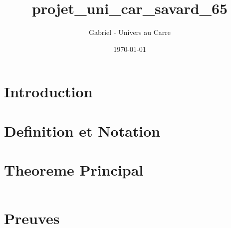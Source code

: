 \documentclass[12pt]{article}
\title{projet_uni_car_savard_65}
\author{Gabriel - Univers au Carre}
\date{\today}
\begin{document}
\maketitle


\section{Introduction}



\section{Definition et Notation}



\section{Theoreme Principal}


\begin{equation}
\end{equation}


\section{Preuves}


\end{document}
